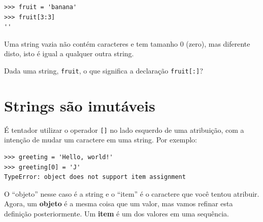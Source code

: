 {%

\beforeverb
\begin{verbatim}
>>> fruit = 'banana'
>>> fruit[3:3]
''
\end{verbatim}
\afterverb
%
%
Uma string vazia não contém caracteres e tem tamanho 0 (zero), mas diferente
disto, isto é igual a qualquer outra string.

\begin{ex}
Dada uma string, {\tt fruit}, o que significa a declaração {\tt fruit[:]}?
\end{ex}

\section{Strings são imutáveis}


É tentador utilizar o operador {\tt []} no lado esquerdo de uma atribuição,
com a intenção de mudar um caractere em uma string. Por exemplo:

\beforeverb
\begin{verbatim}
>>> greeting = 'Hello, world!'
>>> greeting[0] = 'J'
TypeError: object does not support item assignment
\end{verbatim}
\afterverb
%
%
O ``objeto'' nesse caso é a string e o ``item'' é o caractere que você tentou
atribuir. Agora, um {\bf objeto} é a mesma coisa que um valor, mas vamos
refinar esta definição posteriormente. Um {\bf item} é um dos valores em uma
sequência.

}
